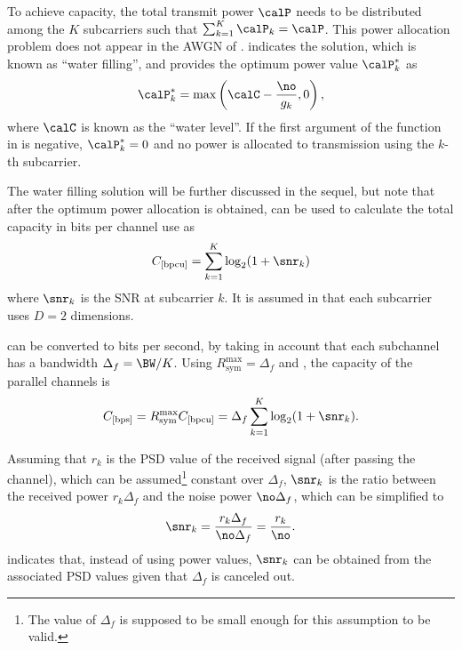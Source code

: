 To achieve capacity, the total transmit power $\calP$ needs to be distributed among the $K$ subcarriers such that $\sum_{k=1}^K \calP_k = \calP$. This power allocation problem does not appear in the AWGN of .
 indicates the solution, which is known as ``water filling'', and provides the optimum power value $\calP_k^*$ as
\begin{equation}
\calP_k^* = \max \left(\calC - \frac{\no}{g_k}, 0 \right),
\label{eq:waterfillingDiscreteSolution}
\end{equation}
where $\calC$ is known as the ``water level''. If the first argument of the  function in  is negative, $\calP_k^* = 0$ and no power is allocated to transmission using the $k$-th subcarrier. 

The water filling solution will be further discussed in the sequel, but note that after the optimum power allocation is obtained,  can be used to calculate the total capacity in bits per channel use as
\begin{equation}
C_{[\textrm{bpcu}]} = \sum_{k=1}^K \log_2 (1 + \snr_k)
\label{eq:totalCapacity}
\end{equation}
where $\snr_k$ is the SNR at subcarrier $k$. It is assumed in  that each subcarrier uses $D=2$ dimensions.

 can be converted to bits per second, by taking in account that each subchannel has a bandwidth $\Delta_f = \BW/K$. Using $R_{\textrm{sym}}^{\textrm{max}} = \Delta_f$ and , the capacity of the parallel channels is
\begin{equation}
C_{[\textrm{bps}]} = R_{\textrm{sym}}^{\textrm{max}} C_{[\textrm{bpcu}]} = \Delta_f \sum_{k=1}^K \log_2 (1 + \snr_k).
\label{eq:totalCapacityInbps}
\end{equation}


Assuming that $r_k$ is the PSD value of the received signal (after passing the channel), which can be assumed\footnote{The value of $\Delta_f$ is supposed to be small enough for this assumption to be valid.} constant over $\Delta_f$, $\snr_k$ is the ratio between the received power $r_k \Delta_f$ and the noise power $\no \Delta_f$, which can be simplified to
\begin{equation}
\snr_k = \frac{r_k \Delta_f}{\no \Delta_f} = \frac{r_k}{\no}.
\label{eq:snr_multicarrier}
\end{equation}
 indicates that, instead of using power values, $\snr_k$ can be obtained from the associated PSD values given that $\Delta_f$ is canceled out.

